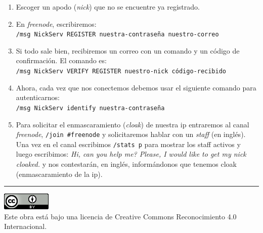 \documentclass[12pt,letterpaper]{article}
\begin{document}
\begin{enumerate}

\item Escoger un apodo (\textit{nick}) que no se encuentre ya registrado.

\item En \textsl{freenode}, escribiremos:\\
\verb!/msg NickServ REGISTER nuestra-contraseña nuestro-correo!

\item Si todo sale bien, recibiremos un correo con un comando y un c\'odigo de confirmaci\'on. El comando es:\\
\verb!/msg NickServ VERIFY REGISTER nuestro-nick código-recibido!

\item Ahora, cada vez que nos conectemos debemos usar el siguiente comando para autenticarnos: \\
\verb!/msg NickServ identify nuestra-contraseña!
    
\item Para solicitar el enmascaramiento (\textit{cloak}) de nuestra ip entraremos al canal \textsl{freenode}, \texttt{/join \#freenode} y solicitaremos hablar con un \textit{staff} (en inglés). Una vez en el canal escribimos \texttt{/stats p} para mostrar los staff activos y luego escribimos: \textit{ Hi, can you help me? Please, I would like to get my nick cloaked.}  y nos contestar\'an, en ingl\'es, inform\'andonos que tenemos cloak (enmascaramiento de la ip).

\end{enumerate}




\noindent\rule{\textwidth}{1pt}

\begin{center}
\includegraphics[scale=.75]{imagenes/cc-by.png}\\
Este obra está bajo una licencia de Creative Commons Reconocimiento 4.0 Internacional.
\end{center}


\theendnotes
\end{document}

